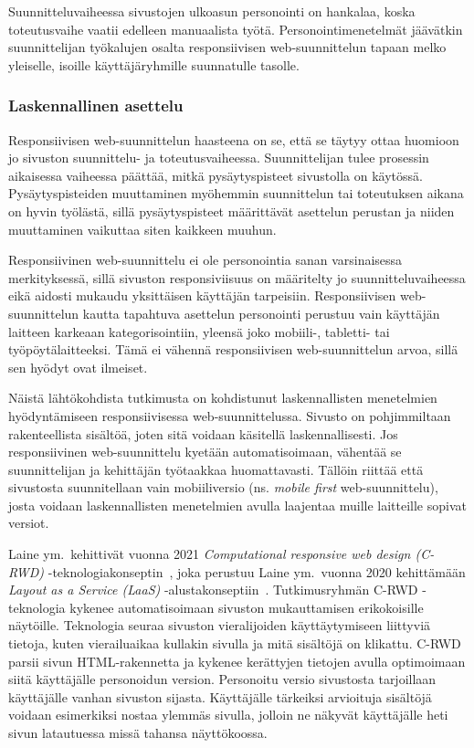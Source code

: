 \documentclass[finnish, 12pt, a4paper, elec, utf8, a-1b, online]{aaltothesis}
\begin{document}
Suunnitteluvaiheessa sivustojen ulkoasun personointi on hankalaa, koska
toteutusvaihe vaatii edelleen manuaalista työtä. Personointimenetelmät jäävätkin
suunnittelijan työkalujen osalta responsiivisen web-suunnittelun tapaan melko
yleiselle, isoille käyttäjäryhmille suunnatulle tasolle.

\subsubsection{Laskennallinen asettelu}

Responsiivisen web-suunnittelun haasteena on se, että se täytyy ottaa huomioon
jo sivuston suunnittelu- ja toteutusvaiheessa. Suunnittelijan tulee prosessin
aikaisessa vaiheessa päättää, mitkä pysäytyspisteet sivustolla on käytössä.
Pysäytyspisteiden muuttaminen myöhemmin suunnittelun tai toteutuksen aikana on
hyvin työlästä, sillä pysäytyspisteet määrittävät asettelun perustan ja niiden
muuttaminen vaikuttaa siten kaikkeen muuhun.

Responsiivinen web-suunnittelu ei ole personointia sanan varsinaisessa
merkityksessä, sillä sivuston responsiviisuus on määritelty jo
suunnitteluvaiheessa eikä aidosti mukaudu yksittäisen käyttäjän tarpeisiin.
Responsiivisen web-suunnittelun kautta tapahtuva asettelun personointi perustuu
vain käyttäjän laitteen karkeaan kategorisointiin, yleensä joko mobiili-,
tabletti- tai työpöytälaitteeksi. Tämä ei vähennä responsiivisen
web-suunnittelun arvoa, sillä sen hyödyt ovat ilmeiset.

Näistä lähtökohdista tutkimusta on kohdistunut laskennallisten menetelmien
hyödyntämiseen responsiivisessa web-suunnittelussa. Sivusto on pohjimmiltaan
rakenteellista sisältöä, joten sitä voidaan käsitellä laskennallisesti. Jos
responsiivinen web-suunnittelu kyetään automatisoimaan, vähentää se
suunnittelijan ja kehittäjän työtaakkaa huomattavasti. Tällöin riittää että
sivustosta suunnitellaan vain mobiiliversio (ns. \textit{mobile first}
web-suunnittelu), josta voidaan laskennallisten menetelmien avulla laajentaa
muille laitteille sopivat versiot.

Laine ym.~kehittivät vuonna 2021 \textit{Computational responsive web design
(C-RWD)} -teknologiakonseptin~\cite{laine2021responsive}, joka perustuu Laine
ym.~vuonna 2020 kehittämään \textit{Layout as a Service (LaaS)}
-alustakonseptiin~\cite{laine2020_laas}. Tutkimusryhmän C-RWD -teknologia
kykenee automatisoimaan sivuston mukauttamisen erikokoisille näytöille.
Teknologia seuraa sivuston vieralijoiden käyttäytymiseen liittyviä tietoja,
kuten vierailuaikaa kullakin sivulla ja mitä sisältöjä on klikattu. C-RWD parsii
sivun HTML-rakennetta ja kykenee kerättyjen tietojen avulla optimoimaan siitä
käyttäjälle personoidun version. Personoitu versio sivustosta tarjoillaan
käyttäjälle vanhan sivuston sijasta. Käyttäjälle tärkeiksi arvioituja sisältöjä
voidaan esimerkiksi nostaa ylemmäs sivulla, jolloin ne näkyvät käyttäjälle heti
sivun latautuessa missä tahansa näyttökoossa.
\end{document}
